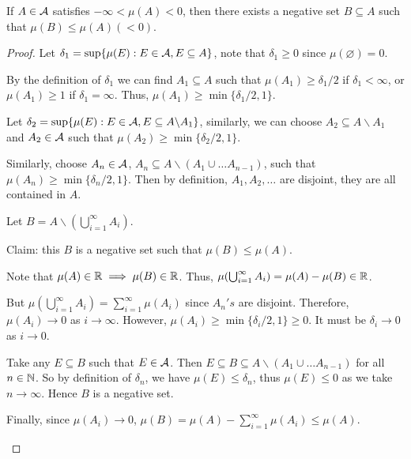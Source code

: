 \documentclass[11pt]{article}
\begin{document}
	\begin{lemma}
		If $A \in \mathcal{{A}}$ satisfies $- \infty < \mu(A) < 0$, then there exists a negative set $B \subseteq A$ such that $\mu(B) \leq \mu(A) (<0)$.
		\begin{proof}
			Let $\delta_1 = \sup\{\mu(E) : E \in \mathcal{{A}}, E \subseteq A\}$, note that $\delta_1 \geq 0$ since $\mu(\varnothing) = 0$.
			
			By the definition of $\delta_1$ we can find $A_1 \subseteq A$ such that $\mu(A_1) \geq \delta_1 / 2$ if $\delta_1 < \infty$, or $\mu(A_1) \geq 1$ if $\delta_1 = \infty$. Thus, $\mu(A_1) \geq \min\{\delta_1/2, 1\}$.
			
			Let $\delta_2 = \sup\{\mu(E) : E \in \mathcal{{A}}, E \subseteq A \backslash A_1 \}$, similarly, we can choose $A_2 \subseteq A \backslash A_1$ and $A_2 \in \mathcal{{A}}$ such that $\mu(A_2) \geq \min\{\delta_2/2, 1\}$.
			
			Similarly, choose $A_n \in \mathcal{{A}}$, $A_n \subseteq A \backslash (A_1 \cup \dots A_{n-1})$, such that $\mu(A_n) \geq \min\{\delta_n/2, 1\}$.
			Then by definition, $A_1, A_2, \dots$ are disjoint, they are all contained in $A$.
			
			Let $B = A \backslash (\bigcup_{i=1}^\infty A_i)$.
			
			Claim: this $B$ is a negative set such that $\mu(B) \leq \mu(A)$.
			\begin{tcolorbox}
				Note that $\mu(A) \in \mathbb{R} \implies \mu(B) \in \mathbb{R}$. Thus, $\mu(\bigcup_{i=1}^\infty A_i) = \mu(A) - \mu(B) \in \mathbb{R}$.
				
				But $\mu(\bigcup_{i=1}^\infty A_i) = \sum_{i=1}^\infty \mu(A_i)$ since $A_n's$ are disjoint. Therefore, $\mu(A_i) \to 0$ as $i \to \infty$.
				However, $\mu(A_i) \geq \min\{\delta_i/2, 1\} \geq 0$.
				It must be $\delta_i \to 0$ as $i \to 0$.
				
				Take any $E \subseteq B$ such that $E \in \mathcal{{A}}$. Then $E \subseteq B \subseteq A \backslash (A_1 \cup \dots A_{n-1})$ for all $n \in \mathbb{N}$. So by definition of $\delta_n$, we have $\mu(E) \leq \delta_n$, thus $\mu(E) \leq 0$ as we take $n \to \infty$. Hence $B$ is a negative set.
				
				Finally, since $\mu(A_i) \to 0$, $\mu(B) = \mu(A) - \sum_{i=1}^\infty \mu(A_i) \leq \mu(A)$.
			\end{tcolorbox}
		\end{proof}
	\end{lemma}
	
\end{document}
